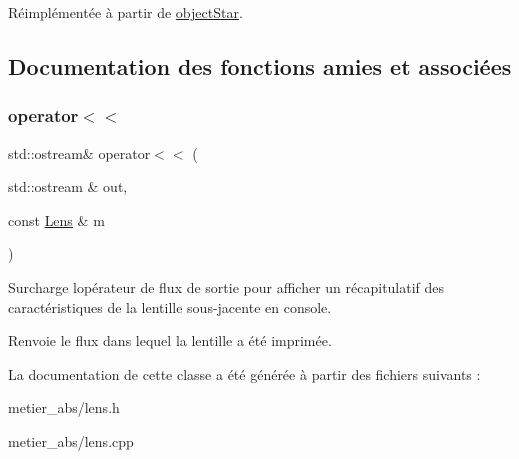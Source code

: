 Réimplémentée à partir de \mbox{\hyperlink{classobject_star_a5155713af07f8397057706a1eeb843ed}{object\+Star}}.



\subsection{Documentation des fonctions amies et associées}
\mbox{\label{class_lens_ad6aeaa87264bd2229fef327ef4c64699}} 
\subsubsection{\texorpdfstring{operator$<$$<$}{operator<<}}
{\footnotesize\ttfamily std\+::ostream\& operator$<$$<$ (\begin{DoxyParamCaption}\item[{std\+::ostream \&}]{out,  }\item[{const \mbox{\hyperlink{class_lens}{Lens}} \&}]{m }\end{DoxyParamCaption})\hspace{0.3cm}{\ttfamily [friend]}}

Surcharge l\textquotesingle{}opérateur de flux de sortie pour afficher un récapitulatif des caractéristiques de la lentille sous-\/jacente en console. \begin{DoxyReturn}{Renvoie}
le flux dans lequel la lentille a été imprimée. 
\end{DoxyReturn}


La documentation de cette classe a été générée à partir des fichiers suivants \+:\begin{DoxyCompactItemize}
\item 
metier\+\_\+abs/lens.\+h\item 
metier\+\_\+abs/lens.\+cpp\end{DoxyCompactItemize}
